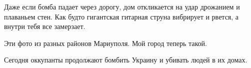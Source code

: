 Даже если бомба падает через дорогу, дом  откликается на удар  дрожанием и
плаваньем стен. Как будто гигантская  гитарная струна вибрирует и рвется, а
внутри тебя все замерзает. 

Эти фото из разных районов Мариуполя. Мой город теперь такой.

Сегодня оккупанты продолжают бомбить Украину и убивать людей в их домах.


